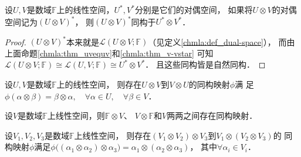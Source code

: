 \begin{proposition}\label{chmla:thm_uvs-usvs}
    设$U,V$是数域$\mathbb{F}$上的线性空间，$U^*, V^*$分别是它们的对偶空间，
    如果将$U\otimes V$的对偶空间记为$(U\otimes V)^*$，
    则$(U\otimes V)^*$同构于$U^* \otimes V^*$．
\end{proposition}
\begin{proof}
    $(U\otimes V)^*$本来就是$\mathscr{L}(U\otimes V;\mathbb{F})$（见定义\ref{chmla:def_dual-space}），
    而由上面命题\ref{chmla:thm_uvequv}和\ref{chmla:thm_v-vstar}
    可知$\mathscr{L}(U\otimes V;\mathbb{F}){\cong}
    \mathscr{L}(U,V;\mathbb{F}){\cong}U^* \otimes V^*$．
    且这些同构皆是自然同构．
\end{proof}

\begin{proposition}\label{chmla:thm_ab-eq-ba}
    设$U,V$是数域$\mathbb{F}$上的线性空间，
    则存在$U\otimes V$到$V\otimes U$的同构映射$\phi$满
    足$\phi(\alpha \otimes \beta) = \beta \otimes \alpha,
    \quad \forall \alpha \in U, \quad \forall \beta \in V$．
\end{proposition}
\begin{proposition}\label{chmla:thm_fv-eq-vf}
    设$V$是数域$\mathbb{F}$上线性空间，则$\mathbb{F}\otimes V$、
    $V\otimes \mathbb{F}$和$V$两两之间存在同构映射．
\end{proposition}
 
\begin{theorem}\label{chmla:thm_12-3EQV1-23}
    设$V_1, V_2, V_3$是数域$\mathbb{F}$上线性空间，
    则存在$(V_1 \otimes V_2) \otimes V_3$到$V_1 \otimes (V_2 \otimes V_3)$的
    同构映射$\phi$满足$\phi\bigl((\alpha_1 \otimes \alpha_2) \otimes \alpha_3\bigr)
    = \alpha_1 \otimes (\alpha_2 \otimes \alpha_3)$，
    其中$\forall \alpha_i \in V_i$．
\end{theorem}

